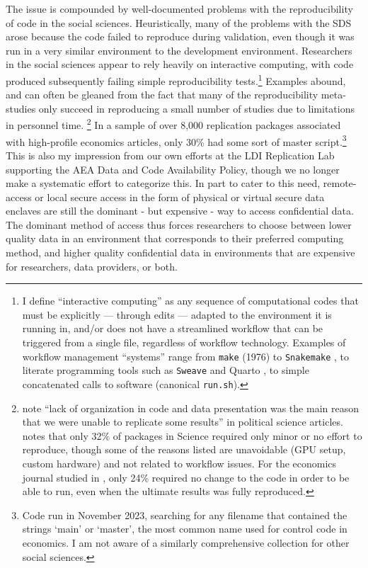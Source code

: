 \documentclass[inline]{hdsr}
\begin{document}
The issue is compounded by well-documented problems with the reproducibility of code in the social sciences. Heuristically, many of the problems with the SDS arose because the code failed to reproduce during validation, even though it was  run in a very similar environment to the development environment. Researchers in the social sciences appear to rely heavily on interactive computing, with code produced subsequently failing simple reproducibility tests.\footnote{I define ``interactive computing'' as any sequence of computational codes that must be explicitly --- through edits --- adapted to the environment it is running in, and/or does not have a streamlined workflow that can be triggered from a single file, regardless of workflow technology. Examples of workflow management ``systems'' range from \texttt{make} (1976) \citep{association_for_computing_machinery_acm_2003} to \texttt{Snakemake} \citep{molder_sustainable_2021}, to literate programming tools such as \texttt{Sweave} \citep{Leisch2002SweaveDG} and Quarto \citep{Allaire_Quarto_2024}, to simple concatenated calls to software (canonical \texttt{run.sh}). } Examples abound, and can often be gleaned from the fact that many of the reproducibility meta-studies only succeed in reproducing a small number of studies due to limitations in personnel time.%
\footnote{\citet{stockemer_data_2018} note ``lack of organization in code and data presentation was the main reason that we were unable to replicate some results'' in political science articles. \citet{StoddenPNAS2018} notes that only 32\% of packages in Science required only minor or no effort to reproduce, though some of the reasons listed are unavoidable (GPU setup, custom hardware) and not related to workflow issues. For the economics journal studied in \citet{herbert_reproduce_2024}, only 24\% required no change to the code in order to be able to run, even when the ultimate results was fully reproduced.}
%
In a sample of over 8,000 replication packages associated with high-profile economics articles, only 30\% had some sort of master script.\footnote{Code run in November 2023, searching for any filename that contained the strings `main' or `master', the most common name used for control code in economics. I am not aware of a similarly comprehensive collection for other social sciences.} This is also my impression from our own efforts at the LDI Replication Lab supporting the AEA Data and Code Availability Policy, though we no longer make a systematic effort to categorize this.  In part to cater to this need, remote-access or local secure access in the form of physical or virtual secure data enclaves are still the dominant - but expensive - way to access confidential data. The dominant method of access thus forces researchers to choose between lower quality data in an environment that corresponds to their preferred computing method, and higher quality confidential data in environments that are expensive for researchers, data providers, or both.
\end{document}
